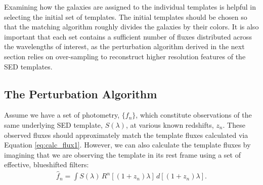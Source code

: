 \documentclass[twocolumn]{aastex63}
\begin{document}
    Examining how the galaxies are assigned to the individual templates is helpful in selecting the initial set of templates.
    The initial templates should be chosen so that the matching algorithm roughly divides the galaxies by their colors.
    It is also important that each set contains a sufficient number of fluxes distributed across the wavelengths of interest, as the perturbation algorithm derived in the next section relies on over-sampling to reconstruct higher resolution features of the SED templates.



    \subsection{The Perturbation Algorithm}
    \label{sect:perturbation}

    Assume we have a set of photometry, $\{f_n\}$, which constitute observations of the same underlying SED template, $S(\lambda)$, at various known redshifts, $z_n$. 
    These observed fluxes should approximately match the template fluxes calculated via Equation \ref{eq:calc_flux1}. 
    However, we can also calculate the template fluxes by imagining that we are observing the template in its rest frame using a set of effective, blueshifted filters:
    \begin{align}
        \hat{f}_n = \int S(\lambda) \, R^n[(1+z_n)\lambda] \, d[(1+z_n)\lambda]. \label{eq:calc_flux2}
    \end{align}
\end{document}
